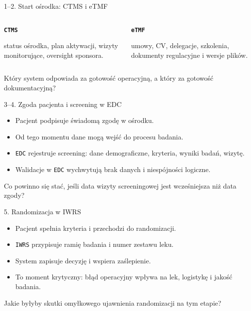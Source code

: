 \begin{frame}{1--2. Start ośrodka: CTMS i eTMF}
  \begin{columns}[T,onlytextwidth]
    \begin{DefinitionBox}
      \textbf{\texttt{CTMS}}\par
      status ośrodka, plan aktywacji, wizyty monitorujące, oversight sponsora.
    \end{DefinitionBox}
    \begin{ExampleBox}
      \textbf{\texttt{eTMF}}\par
      umowy, CV, delegacje, szkolenia, dokumenty regulacyjne i wersje plików.
    \end{ExampleBox}
  \end{columns}
  \vspace{0.5em}
  \begin{QuestionBox}
    Który system odpowiada za gotowość operacyjną, a który za gotowość dokumentacyjną?
  \end{QuestionBox}
\end{frame}

\begin{frame}{3--4. Zgoda pacjenta i screening w EDC}
  \begin{itemize}
    \item Pacjent podpisuje świadomą zgodę w ośrodku.
    \item Od tego momentu dane mogą wejść do procesu badania.
    \item \texttt{EDC} rejestruje screening: dane demograficzne, kryteria, wyniki badań, wizytę.
    \item Walidacje w \texttt{EDC} wychwytują brak danych i niespójności logiczne.
  \end{itemize}
  \begin{QuestionBox}
    Co powinno się stać, jeśli data wizyty screeningowej jest wcześniejsza niż data zgody?
  \end{QuestionBox}
\end{frame}

\begin{frame}{5. Randomizacja w IWRS}
  \begin{itemize}
    \item Pacjent spełnia kryteria i przechodzi do randomizacji.
    \item \texttt{IWRS} przypisuje ramię badania i numer zestawu leku.
    \item System zapisuje decyzję i wspiera zaślepienie.
    \item To moment krytyczny: błąd operacyjny wpływa na lek, logistykę i jakość badania.
  \end{itemize}
  \begin{QuestionBox}
    Jakie byłyby skutki omyłkowego ujawnienia randomizacji na tym etapie?
  \end{QuestionBox}
\end{frame}

